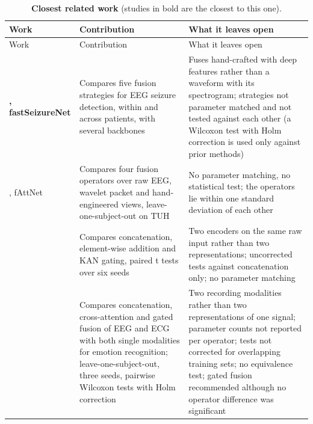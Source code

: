\documentclass[11pt,a4paper]{article}
\begin{document}
\begin{longtable}[]{@{}
  >{\raggedright\arraybackslash}p{}
  >{\raggedright\arraybackslash}p{}
  >{\raggedright\arraybackslash}p{}@{}}
\caption{\textbf{Closest related work} (studies in bold are the closest to this one).}\tabularnewline
\toprule\noalign{}
\begin{minipage}[b]{\linewidth}\raggedright
Work
\end{minipage} & \begin{minipage}[b]{\linewidth}\raggedright
Contribution
\end{minipage} & \begin{minipage}[b]{\linewidth}\raggedright
What it leaves open
\end{minipage} \\
\midrule\noalign{}
\endfirsthead
\toprule\noalign{}
\begin{minipage}[b]{\linewidth}\raggedright
Work
\end{minipage} & \begin{minipage}[b]{\linewidth}\raggedright
Contribution
\end{minipage} & \begin{minipage}[b]{\linewidth}\raggedright
What it leaves open
\end{minipage} \\
\midrule\noalign{}
\endhead
\bottomrule\noalign{}
\endlastfoot
\textbf{\citet{An_2026}, fastSeizureNet} & Compares five fusion strategies for EEG seizure detection, within and across patients, with several backbones & Fuses hand-crafted with deep features rather than a waveform with its spectrogram; strategies not parameter matched and not tested against each other (a Wilcoxon test with Holm correction is used only against prior methods) \\
\citet{Einizade_2023}, fAttNet & Compares four fusion operators over raw EEG, wavelet packet and hand-engineered views, leave-one-subject-out on TUH & No parameter matching, no statistical test; the operators lie within one standard deviation of each other \\
\citet{Basheer_2026} & Compares concatenation, element-wise addition and KAN gating, paired t tests over six seeds & Two encoders on the same raw input rather than two representations; uncorrected tests against concatenation only; no parameter matching \\
\textbf{\citet{Miantezila_Junior_2026}} & Compares concatenation, cross-attention and gated fusion of EEG and ECG with both single modalities for emotion recognition; leave-one-subject-out, three seeds, pairwise Wilcoxon tests with Holm correction & Two recording modalities rather than two representations of one signal; parameter counts not reported per operator; tests not corrected for overlapping training sets; no equivalence test; gated fusion recommended although no operator difference was significant \\

\end{longtable}
\end{document}

